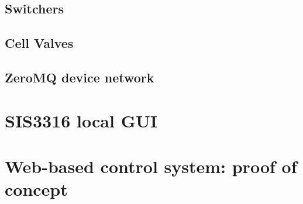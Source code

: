 
\subsection{Switchers}



\subsection{Cell Valves}



\subsection{ZeroMQ device network}



\section{SIS3316 local GUI}



\section{Web-based control system: proof of concept}


